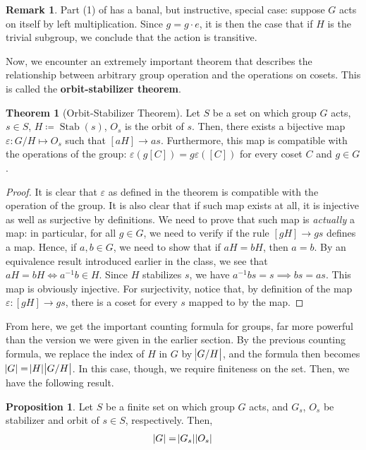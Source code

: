 \documentclass[11pt]{amsart} %
\theoremstyle{definition}
\newtheorem{proposition}[definition]{Proposition}
\newtheorem{theorem}[definition]{Theorem}
\theoremstyle{definition}
\newtheorem{remark}[definition]{Remark}
\DeclareMathOperator{\stab}{Stab}
\numberwithin{equation}{section}
\begin{document}
\begin{remark}
	Part (1) of  has a banal, but instructive, special case: suppose $G$ acts on itself by left multiplication. Since $g = g \cdot e$, it is then the case that if $H$ is the trivial subgroup, we conclude that the action is transitive.
\end{remark}

Now, we encounter an extremely important theorem that describes the relationship between arbitrary group operation and the operations on cosets. This is called the \textbf{orbit-stabilizer theorem}.
\begin{theorem}[Orbit-Stabilizer Theorem]
	\label{thmorbitstabilizertheorem}
	Let $S$ be a set on which group $G$ acts, $s \in S$, $H \coloneqq \stab(s)$, $O_s$ is the orbit of $s$. Then, there exists a bijective map $\varepsilon : G / H \mapsto O_s$ such that $[aH] \to as$. Furthermore, this map is compatible with the operations of the group: $\varepsilon(g[C]) = g \varepsilon([C])$ for every coset $C$ and $g \in G$.
\end{theorem}

\begin{proof}
	It is clear that $\varepsilon$ as defined in the theorem is compatible with the operation of the group. It is also clear that if such map exists at all, it is injective as well as surjective by definitions. We need to prove that such map is \textit{actually} a map: in particular, for all $g \in G$, we need to verify if the rule $[gH] \to gs$ defines a map. Hence, if $a, b \in G$, we need to show that if $aH = bH$, then $a = b$. By an equivalence result introduced earlier in the class, we see that $aH=bH \iff a^{-1}b \in H$. Since $H$ stabilizes $s$, we have $a^{-1} b s = s \implies bs =as$. This map is obviously injective. For surjectivity, notice that, by definition of the map $\varepsilon: [gH] \to gs$, there is a coset for every $s$ mapped to by the map.
\end{proof}

From here, we get the important counting formula for groups, far more powerful than the version we were given in the earlier section. By the previous counting formula, we replace the index of $H$ in $G$ by $\abs{G/H}$, and the formula then becomes $\abs{G} = \abs{H} \abs{G/H}$. In this case, though, we require finiteness on the set. Then, we have the following result.

\begin{proposition}
	\label{propcountingformulawithorbitstab}
	Let $S$ be a finite set on which group $G$ acts, and $G_s$, $O_s$ be stabilizer and orbit of $s \in S$, respectively. Then,
	\begin{align*}
	\abs{G} = \abs{G_s} \abs{O_s}
	\end{align*}
\end{proposition}
\end{document}
